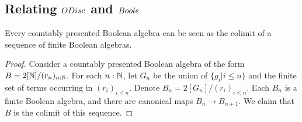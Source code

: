 \subsection{Relating $\ODisc$ and $\Boole$}
\begin{lemma}\label{BooleIsODisc}
  Every countably presented Boolean algebra can be seen as the colimit 
  of a sequence of finite Boolean algebras. 
\end{lemma}
\begin{proof}
  Consider a countably presented Boolean algebra of the form $B = 2[\mathbb{N}]/(r_n)_{n:\mathbb{N}}$. 
  For each $n:\mathbb{N}$, let $G_n$ be the union of $\{g_i|{i\leq n}\}$ and 
  the finite set of terms occurring in $(r_i)_{i\leq n}$. 
  Denote $B_n = 2[G_n]/(r_i)_{i\leq n}$. 
  Each $B_n$ is a finite Boolean algebra, and there are canonical maps $B_n \to B_{n+1}$.
  We claim that $B$ is the colimit of this sequence. 
%
%
\end{proof}




